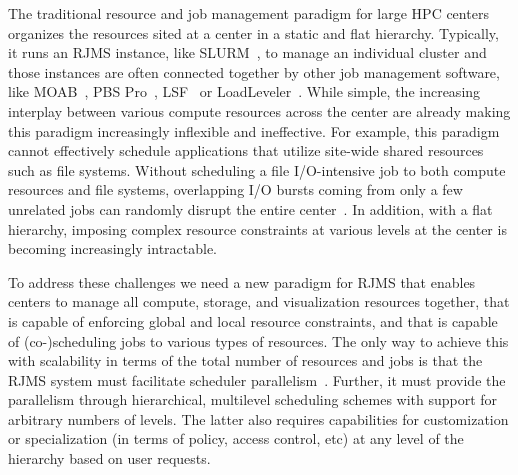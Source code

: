 The traditional resource and job management paradigm
for large HPC centers organizes the resources sited
at a center in a static and flat hierarchy. Typically, it 
runs an RJMS instance, like SLURM~\cite{Jette02slurm}, to manage an individual cluster
and those instances are often connected together by 
other job management software, like MOAB~\cite{MOAB}, PBS Pro~\cite{PSBPro}, LSF~\cite{LSF}
or LoadLeveler~\cite{LL}.
While simple, the increasing interplay 
between various compute resources across the center
are already making this paradigm increasingly 
inflexible and ineffective. 
For example, this paradigm cannot effectively
schedule applications that utilize site-wide shared 
resources such as file systems. 
Without scheduling a file I/O-intensive job 
to both compute resources and file systems, 
overlapping I/O bursts coming from only a few
unrelated jobs can randomly disrupt the entire center~\cite{SCR,SPINDLE}. 
In addition, with a flat hierarchy, imposing complex 
resource constraints at various levels at the center
is becoming increasingly intractable. 

To address these challenges we need 
a new paradigm for RJMS that enables centers to manage
all compute, storage, and visualization resources together, 
that is capable of enforcing global and local resource constraints,
and that
is capable of 
(co-)scheduling jobs to various types of resources.
The only way to achieve this with scalability in terms of the total number 
of resources and jobs is that the RJMS system must 
facilitate scheduler parallelism~\cite{Omega,Mesos}. Further, it must
provide the parallelism through hierarchical, multilevel 
scheduling schemes with support for arbitrary numbers of levels.
The latter also requires capabilities for customization or specialization (in terms
of policy, access control, etc) at any level of the hierarchy based on user requests.

